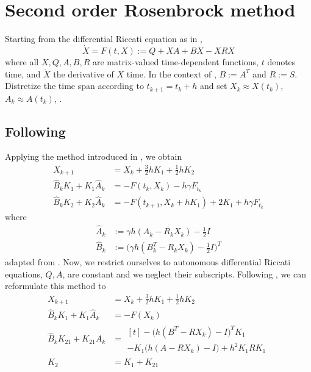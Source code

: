 \chapter{Second order Rosenbrock method}

Starting from the differential Riccati equation as in \cite{MPIMD11-06},
\begin{equation}
  \dot X = F(t, X) := Q + XA + BX - XRX
\end{equation}
where all $X, Q, A, B, R$ are matrix-valued time-dependent functions,
$t$ denotes time, and $\dot X$ the derivative of $X$ \wrt time.
In the context of \cite{Mena2007,MPIMD12-13,Lang2015}, $B:=A^T$ and $R:=S$.
Distretize the time span according to $t_{k+1} = t_k + h$
and set $X_k \approx X(t_k)$, $A_k \approx A(t_k)$, \etc.

\section{Following \cite{Mena2007}}

Applying the method introduced in \cite{Verwer1999}, we obtain
\begin{subequations}\label{eq:mena:stages}
\begin{align}
  X_{k+1} &= X_k + \tfrac{3}{2} h K_1 + \tfrac{1}{2} h K_2 \\
  \hat{B}_k K_1 + K_1 \hat{A}_k &= -F(t_k, X_k) - h\gamma F_{t_k} \\
  \hat{B}_k K_2 + K_2 \hat{A}_k &= -F(t_{k+1}, X_k + hK_1) + 2K_1 + h\gamma F_{t_k}
\end{align}
\end{subequations}
where
\begin{subequations} \label{eq:mena:coeffs}
\begin{align}
  \hat{A}_k &:= \gamma h (A_k - R_k X_k) - \tfrac{1}{2} I \\
  \hat{B}_k &:= \big( \gamma h (B^T_k - R_k X_k) - \tfrac{1}{2} I \big)^T
\end{align}
\end{subequations}
adapted from \cite[Equations (4.37) to (4.39)]{Mena2007}.
Now, we restrict ourselves to autonomous differential Riccati equations,
\ie $Q, A$, \etc are constant and we neglect their subscripts.
Following \cite[Equation (4.40)]{Mena2007}, we can reformulate this method to
\begin{subequations}
\begin{align}
  X_{k+1} &= X_k + \tfrac{3}{2} h K_1 + \tfrac{1}{2} h K_2 \\
  \hat{B}_k K_1 + K_1 \hat{A}_k &= -F(X_k) \\
  \hat{B}_k K_{21} + K_{21} \hat{A}_k &= \begin{multlined}[t]
    -\big( h(B^T - RX_k) - I \big)^T K_1 \\
    - K_1 \big( h(A - RX_k) - I \big) + h^2 K_1RK_1
    \label{eq:mena:err:quadratic}
  \end{multlined} \\
  K_2 &= K_1 + K_{21}
\end{align}
\end{subequations}

